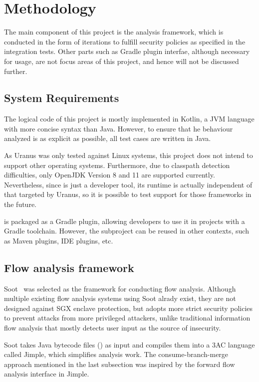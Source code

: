 \section{Methodology}\label{sec:methodology}
The main component of this project is the analysis framework,
which is conducted in the form of iterations
to fulfill security policies as specified in the integration tests.
Other parts such as Gradle plugin interfae,
although necessary for usage,
are not focus areas of this project, and hence will not be discussed further.



\subsection{System Requirements}\label{subsec:system-requirements}
The logical code of this project is mostly implemented in Kotlin,
a \ac{JVM} language with more concise syntax than Java.
However, to ensure that he behaviour analyzed
is as explicit as possible,
all test cases are written in Java.

As Uranus was only tested against Linux systems,
this project does not intend to support other operating systems.
Furthermore, due to classpath detection difficulties,
only OpenJDK Version 8 and 11 are supported currently.
Nevertheless, since \pname{} is just a developer tool,
its runtime is actually independent of that targeted by Uranus,
so it is possible to test support for those frameworks in the future.

\pname{} is packaged as a Gradle plugin,
allowing developers to use it in projects with a Gradle toolchain.
However, the  subproject can be reused in other contexts,
such as Maven plugins, IDE plugins, etc.

\subsection{Flow analysis framework}\label{subsec:flow-analysis-framework}
Soot~\cite{sootsurvivor} was selected as the framework for conducting flow analysis.
Although multiple existing flow analysis systems using Soot alrady exist,
they are not designed against \ac{SGX} enclave protection,
but \pname{} adopts more strict security policies
to prevent attacks from more privileged attackers,
unlike traditional information flow analysis
that mostly detects user input as the source of insecurity.

Soot takes Java bytecode files () as input
and compiles them into a \ac{3AC} language called Jimple,
which simplifies analysis work.
The consume-branch-merge approach mentioned in the last subsection
was inspired by the forward flow analysis interface in Jimple.

